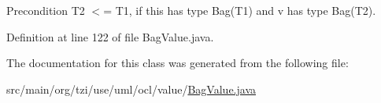 \begin{DoxyPrecond}{Precondition}
T2 $<$= T1, if this has type Bag(\-T1) and v has type Bag(\-T2). 
\end{DoxyPrecond}


Definition at line 122 of file Bag\-Value.\-java.



The documentation for this class was generated from the following file\-:\begin{DoxyCompactItemize}
\item 
src/main/org/tzi/use/uml/ocl/value/\hyperlink{_bag_value_8java}{Bag\-Value.\-java}\end{DoxyCompactItemize}
